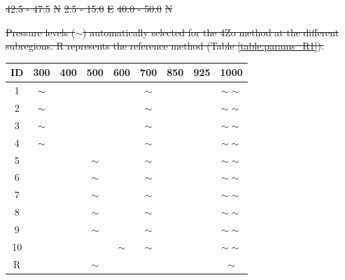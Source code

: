 \documentclass[review]{elsarticle}
\providecommand{\DIFdeltex}[1]{{\protect\color{red}\sout{#1}}}                      %
\providecommand{\DIFdelFL}[1]{\DIFdel{#1}} %
\providecommand{\DIFdelendFL}{} %
\providecommand{\DIFdel}[1]{\texorpdfstring{\DIFdeltex{#1}}{}} %
\begin{document}
\begin{table}[t]
\begin{center}
		\DIFdelFL{42.5 - 47.5 }%
		\DIFdelFL{N }%
		\DIFdelFL{2.5 - 15.0 }%
		\DIFdelFL{E }%
		\DIFdelFL{40.0 - 50.0 }%
		\DIFdelFL{N }%
		
		{%
			\DIFdelFL{Pressure levels ($\sim$) automatically selected for the 4Zo method at the different subregions. R represents the reference method (Table \ref{table:params_R1}).}}
		\DIFdelendFL \begin{tabular}{ccccccccc}
			\hline ID & 300 & 400 & 500 & 600 & 700 & 850 & 925 & 1000 \\ 
			\hline 
			1  & $\sim$ &   &   &   & $\sim$ &   &   & $\sim \sim$ \\
			2  & $\sim$ &   &   &   & $\sim$ &   &   & $\sim \sim$ \\
			3  & $\sim$ &   &   &   & $\sim$ &   &   & $\sim \sim$ \\
			4  & $\sim$ &   &   &   & $\sim$ &   &   & $\sim \sim$ \\
			5  &   &   & $\sim$ &   & $\sim$ &   &   & $\sim \sim$ \\
			6  &   &   & $\sim$ &   & $\sim$ &   &   & $\sim \sim$ \\
			7  &   &   & $\sim$ &   & $\sim$ &   &   & $\sim \sim$ \\
			8  &   &   & $\sim$ &   & $\sim$ &   &   & $\sim \sim$ \\
			9  &   &   & $\sim$ &   & $\sim$ &   &   & $\sim \sim$ \\
			10 &   &   &   & $\sim$ & $\sim$ &   &   & $\sim \sim$ \\
			\hline 	
			R  &   &   & $\sim$ &   &   &   &   & $\sim$ \\
			\hline 
		\end{tabular} 
	\end{center}
	\label{table:levels_GA_4Zo}
\end{table}
	
\end{document}
